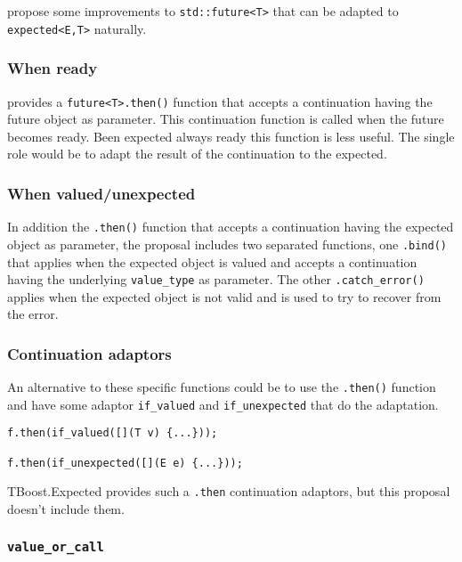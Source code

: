 \documentclass[a4paper,10pt]{article}
\newcommand{\cpp}[1]{\lstinline{#1}}
\begin{document}
\cite{ImprovementsAsync} propose some improvements to \cpp{std::future<T>} that can be adapted to \cpp{expected<E,T>} naturally.

\subsubsection{When ready}

\cite{ImprovementsAsync} provides a \cpp{future<T>.then()} function that accepts a continuation having the future object as parameter. This continuation function is called when the future becomes ready. Been expected always ready this function is less useful. The single role would be to adapt the result of the continuation to the expected.

\subsubsection{When valued/unexpected}

In addition the \cpp{.then()} function that accepts a continuation having the expected object as parameter, the proposal includes two separated functions, one \cpp{.bind()} that applies when the expected object is valued and accepts a continuation having the underlying \cpp{value_type} as parameter. The other \cpp{.catch_error()} applies when the expected object is not valid and is used to try to recover from the error.  

\subsubsection{Continuation adaptors}

An alternative to these specific functions could be to use the \cpp{.then()} function and have some adaptor \cpp{if_valued} and \cpp{if_unexpected} that do the adaptation.

\begin{lstlisting}
f.then(if_valued([](T v) {...}));

f.then(if_unexpected([](E e) {...}));
\end{lstlisting}

TBoost.Expected \cite{boost_expected} provides such a \cpp{.then} continuation adaptors, but this proposal doesn't include them.

\subsubsection{\cpp{value_or_call}}
\end{document}
